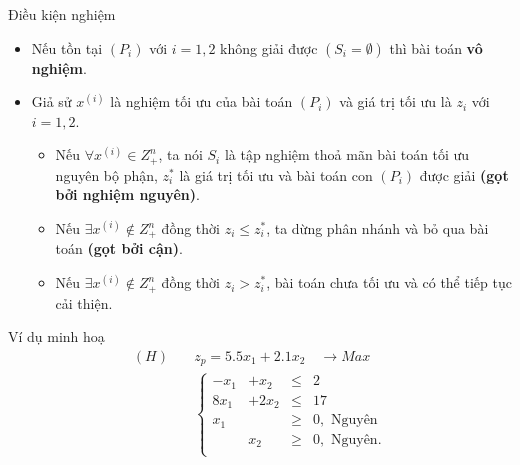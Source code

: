 \documentclass[10pt]{beamer}
\newtheorem{cy}{Chú ý}[section]
\begin{document}
\begin{frame}{Điều kiện nghiệm}
\begin{itemize}
\item<1-> Nếu tồn tại $(P_i)$ với $i=1,2$ không giải được $(S_i = \emptyset )$ thì bài toán \textbf{vô nghiệm}.
\medskip
\item<2-> Giả sử $x^{(i)}$ là nghiệm tối ưu của bài toán $(P_i)$ và giá trị tối ưu là $z_i$ với $i = 1,2$.
\begin{itemize}
\item<3-> Nếu $\forall x^{(i)} \in Z^n_+$, ta nói $S_i$ là tập nghiệm thoả mãn bài toán tối ưu nguyên bộ phận, $z^*_i$ là giá trị tối ưu và bài toán con $(P_i)$ được giải \textbf{(gọt bởi nghiệm nguyên)}.
\item<4-> Nếu $\exists x^{(i)} \notin Z^n_+$ đồng thời $z_i \leq z^*_i$, ta dừng phân nhánh và bỏ qua bài toán \textbf{(gọt bởi cận)}.
\item<5-> Nếu $\exists x^{(i)} \notin Z^n_+$ đồng thời $z_i > z^*_i$, bài toán chưa tối ưu và có thể tiếp tục cải thiện.
\end{itemize}
\end{itemize}
\medskip
{}
\end{frame}

\begin{frame}{Ví dụ minh hoạ}
    \begin{equation*}
        \begin{split}
            (H) \quad &z_p= 5.5x_1 + 2.1x_2 \quad \longrightarrow Max \\
            & \left\{\begin{array}{cccc}
            -x_1 &+ x_2 &\leq& 2 \\
            8x_1 &+ 2x_2 &\leq& 17 \\
            x_1 &&\geq& 0, \text{ Nguyên}\\
            &x_2 &\geq& 0, \text{ Nguyên}. \\
            \end{array}\right. \\
        \end{split}
    \end{equation*}
\end{frame}
\end{document}
